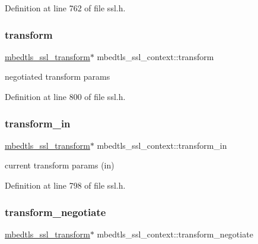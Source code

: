 Definition at line 762 of file ssl.\+h.

\mbox{\label{structmbedtls__ssl__context_a501f615c5b6da6b21f666e913e96f343}} 
\subsubsection{\texorpdfstring{transform}{transform}}
{\footnotesize\ttfamily \mbox{\hyperlink{structmbedtls__ssl__transform}{mbedtls\+\_\+ssl\+\_\+transform}}$\ast$ mbedtls\+\_\+ssl\+\_\+context\+::transform}

negotiated transform params 

Definition at line 800 of file ssl.\+h.

\mbox{\label{structmbedtls__ssl__context_ac7ca7e3d2ee75a1d38f6dc8014c789d1}} 
\subsubsection{\texorpdfstring{transform\+\_\+in}{transform\_in}}
{\footnotesize\ttfamily \mbox{\hyperlink{structmbedtls__ssl__transform}{mbedtls\+\_\+ssl\+\_\+transform}}$\ast$ mbedtls\+\_\+ssl\+\_\+context\+::transform\+\_\+in}

current transform params (in) 

Definition at line 798 of file ssl.\+h.

\mbox{\label{structmbedtls__ssl__context_adce09e981f24eb615a5450194750deb7}} 
\subsubsection{\texorpdfstring{transform\+\_\+negotiate}{transform\_negotiate}}
{\footnotesize\ttfamily \mbox{\hyperlink{structmbedtls__ssl__transform}{mbedtls\+\_\+ssl\+\_\+transform}}$\ast$ mbedtls\+\_\+ssl\+\_\+context\+::transform\+\_\+negotiate}

